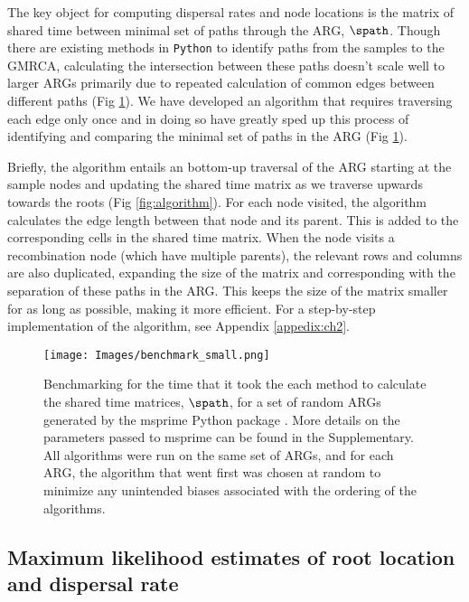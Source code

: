 The key object for computing dispersal rates and node locations is the matrix of shared time between minimal set of paths through the ARG, $\spath$. Though there are existing methods in {\tt Python} to identify paths from the samples to the GMRCA, calculating the intersection between these paths doesn't scale well to larger ARGs primarily due to repeated calculation of common edges between different paths (Fig \ref{fig:AlgorithmEff}). We have developed an algorithm that requires traversing each edge only once and in doing so have greatly sped up this process of identifying and comparing the minimal set of paths in the ARG (Fig \ref{fig:AlgorithmEff}). 

Briefly, the algorithm entails an bottom-up traversal of the ARG starting at the sample nodes and updating the shared time matrix as we traverse upwards towards the roots (Fig \ref{fig:algorithm}). For each node visited, the algorithm calculates the edge length between that node and its parent. This is added to the corresponding cells in the shared time matrix. When the node visits a recombination node (which have multiple parents), the relevant rows and columns are also duplicated, expanding the size of the matrix and corresponding with the separation of these paths in the ARG. This keeps the size of the matrix smaller for as long as possible, making it more efficient. For a step-by-step implementation of the algorithm, see Appendix \ref{appedix:ch2}.

\begin{figure}[h]
    \centering
    \texttt{[image: Images/benchmark\_small.png]}
    \caption{Benchmarking for the time that it took the each method to calculate the shared time matrices, $\spath$, for a set of random ARGs generated by the msprime Python package \citep{Baumdicker2022}. More details on the parameters passed to msprime can be found in the Supplementary. All algorithms were run on the same set of ARGs, and for each ARG, the algorithm that went first was chosen at random to minimize any unintended biases associated with the ordering of the algorithms.}
    \label{fig:AlgorithmEff}
\end{figure}



\subsection{Maximum likelihood estimates of root location and dispersal rate}

